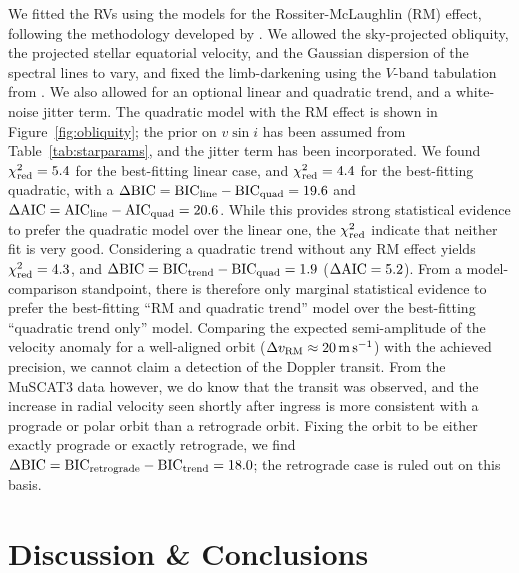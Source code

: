 \documentclass[12pt,modern,twocolumn,tighten]{aastex63}
\begin{document}
We fitted the RVs using the \citet{hirano_analytic_2010,hirano_2011}
models for the Rossiter-McLaughlin (RM) effect, 
following the methodology developed by \citet{stefansson_2020}.
We allowed the sky-projected obliquity, the projected stellar equatorial
velocity, and the Gaussian dispersion of the spectral lines to vary, and fixed the limb-darkening
using the $V$-band tabulation from \citet{claret_gravity_2011}.  We also
allowed
for an optional linear and quadratic trend, and a white-noise jitter
term.  The quadratic model with the RM effect is shown in
Figure~\ref{fig:obliquity}; the prior on $v\sin i$ has been assumed
from Table~\ref{tab:starparams}, and the jitter term has been
incorporated.
We found $\chi^2_{\rm red} =
5.4$ for the best-fitting linear case, and $\chi^2_{\rm red} = 4.4$
for the best-fitting quadratic, with a $\Delta {\rm BIC} = {\rm
BIC}_{\rm line} - {\rm BIC}_{\rm quad} = 19.6$ and $\Delta {\rm AIC} =
{\rm AIC}_{\rm line} - {\rm AIC}_{\rm quad} = 20.6$.  While this
provides strong statistical evidence to prefer the quadratic model
over the linear one, the $\chi^2_{\rm red}$ indicate that neither fit
is very good.  Considering a quadratic trend without any RM
effect yields $\chi^2_{\rm red} = 4.3$, and $\Delta {\rm BIC} = {\rm
BIC}_{\rm trend} - {\rm BIC}_{\rm quad} = 1.9$ ($\Delta {\rm
AIC}=5.2$).  From a model-comparison standpoint, there is therefore
only marginal statistical evidence to prefer the best-fitting ``RM and
quadratic trend'' model over the best-fitting ``quadratic trend only''
model.  Comparing the expected semi-amplitude of the velocity anomaly
for a well-aligned orbit ($\Delta v_{\rm RM}\approx 20\,{\rm m\,s}^{-1}$) with the achieved precision,
we cannot claim a detection of the Doppler transit.
From the MuSCAT3 data however, we do know that the transit
was observed, and the increase in radial velocity seen shortly after
ingress is more consistent with a prograde or polar orbit than a
retrograde orbit.  Fixing the orbit to be either exactly prograde or
exactly retrograde, we find $\Delta {\rm BIC} = {\rm BIC}_{\rm
retrograde} - {\rm BIC}_{\rm trend} = 18.0$; the retrograde case is
ruled out on this basis.


\section{Discussion \& Conclusions}
\label{sec:conc}


\end{document}
